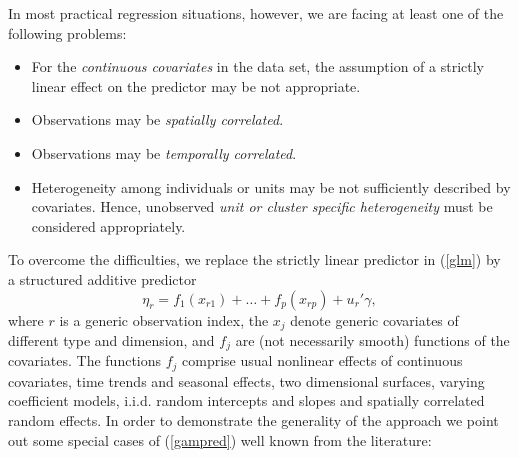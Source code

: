 \documentclass[11pt,a4paper,twoside]{bayesxarticle}
\begin{document}
In most practical regression situations, however, we are facing at
least one of the following problems:
\begin{itemize}
\item For the {\em continuous covariates} in the data set, the assumption of a strictly linear
effect on the predictor may be not appropriate. \vspace{-0.2cm}
\item Observations may be {\em spatially correlated}.
\vspace{-0.2cm}
\item Observations may be {\em temporally correlated}.
\vspace{-0.2cm}
\item  Heterogeneity among individuals or units may be not sufficiently described by covariates. Hence,
unobserved {\em unit or cluster specific heterogeneity} must be
considered appropriately.
\end{itemize}
To overcome the difficulties, we replace the strictly linear
predictor in (\ref{glm}) by a structured additive predictor
\begin{equation}
\label{gampred}
\eta_{r}=f_{1}(x_{r1})+\dots+f_{p}(x_{rp})+u_r'\gamma,
\end{equation}
where $r$ is a generic observation index, the $x_j$ denote generic
covariates of different type and dimension, and $f_j$ are (not
necessarily smooth) functions of the covariates. The functions
$f_j$ comprise usual nonlinear effects of continuous covariates,
time trends and seasonal effects, two dimensional surfaces,
varying coefficient models, i.i.d. random intercepts and slopes
and spatially correlated random effects. In order to demonstrate
the generality of the approach we point out some special cases of
(\ref{gampred}) well known from the literature:
\end{document}
